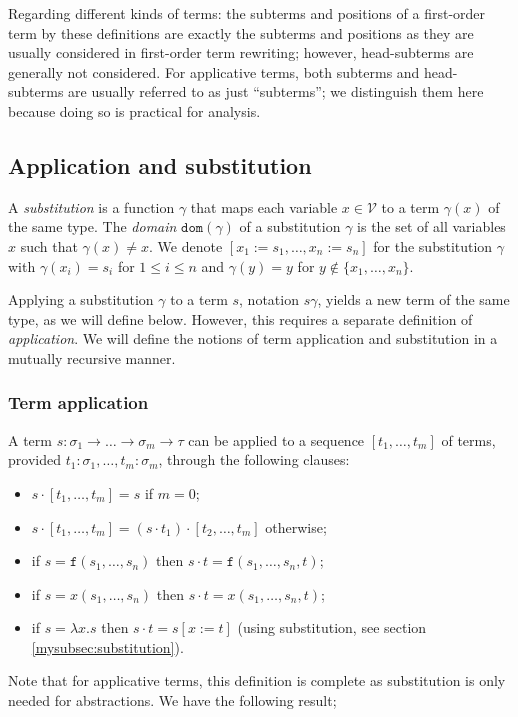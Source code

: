 \documentclass{lmcs}
\theoremstyle{theorem}\newtheorem{theorem}{Theorem}
\theoremstyle{theorem}\newtheorem{lemma}[theorem]{Lemma}
\theoremstyle{theorem}\newtheorem{corollary}[theorem]{Corollary}
\theoremstyle{definition}\newtheorem{definition}[theorem]{Definition}
\theoremstyle{definition}\newtheorem{example}[theorem]{Example}
\newcommand{\V}{\mathcal{V}}
\newcommand{\domain}{\mathtt{dom}}
\newcommand{\atype}{\sigma}
\newcommand{\btype}{\tau}
\newcommand{\identifier}[1]{\mathtt{#1}}
\newcommand{\afun}{\identifier{f}}
\newcommand{\avar}{x}
\newcommand{\abs}[2]{\lambda #1.#2}
\newcommand{\arrtype}{\rightarrow}
\newcommand{\mysubsection}[1]{\vspace{-12pt}\subsubsection{#1}}
\begin{document}
Regarding different kinds of terms: the subterms and positions of a first-order term by these
definitions are exactly the subterms and positions as they are usually considered in first-order
term rewriting; however, head-subterms are generally not considered.  For applicative terms,
both subterms and head-subterms are usually referred to as just ``subterms''; we distinguish them
here because doing so is practical for analysis.

\subsection{Application and substitution}

A \emph{substitution} is a function $\gamma$ that maps each variable $\avar \in \V$ to a term
$\gamma(\avar)$ of the same type.
The \emph{domain} $\domain(\gamma)$ of a substitution $\gamma$ is the set of all variables $x$
such that $\gamma(x) \neq x$.
We denote $[x_1:=s_1,\dots,x_n:=s_n]$ for the substitution $\gamma$ with $\gamma(x_i) = s_i$ for
$1 \leq i \leq n$ and $\gamma(y) = y$ for $y \notin \{x_1,\dots,x_n\}$.

Applying a substitution $\gamma$ to a term $s$, notation $s\gamma$, yields a new term of the same
type, as we will define below. However, this requires a separate definition of \emph{application}.
We will define the notions of term application and substitution in a mutually recursive manner.

\mysubsection{Term application}\label{mysubsec:application}
A term $s : \atype_1 \arrtype \dots \arrtype \atype_m \arrtype \btype$ can be applied to a sequence
$[t_1,\dots,t_m]$ of terms, provided $t_1 : \atype_1,\dots,t_m : \atype_m$, through the following
clauses:
\begin{itemize}
\item $s \cdot [t_1,\dots,t_m] = s$ if $m = 0$;
\item $s \cdot [t_1,\dots,t_m] = (s \cdot t_1) \cdot [t_2,\dots,t_m]$ otherwise;
\item if $s = \afun(s_1,\dots,s_n)$ then $s \cdot t = \afun(s_1,\dots,s_n,t)$;
\item if $s = \avar(s_1,\dots,s_n)$ then $s \cdot t = \avar(s_1,\dots,s_n,t)$;
\item if $s = \abs{\avar}{s}$ then $s \cdot t = s[\avar:=t]$ (using substitution, 
  see section \ref{mysubsec:substitution}).
\end{itemize}

\bigskip
Note that for applicative terms, this definition is complete as substitution is only needed for
abstractions.  We have the following result;
\end{document}
